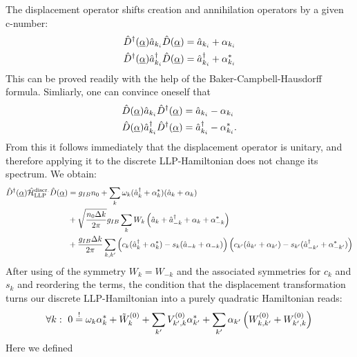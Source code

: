 The displacement operator shifts creation and annihilation operators by a given c-number:
\begin{subequations}
\begin{align}
\hat D^\dagger(\underline \alpha)\hat a_{k_i}\hat D(\underline\alpha)&=\hat a_{k_i}+\alpha_{k_i}\\
\hat D^\dagger(\underline \alpha)\hat a^\dagger_{k_i}\hat D(\underline\alpha)&=\hat a^\dagger_{k_i}+\alpha_{k_i}^*
\end{align}
\end{subequations}
This can be proved readily with the help of the Baker-Campbell-Hausdorff formula.
Simliarly, one can convince oneself that
\begin{subequations}
\begin{align}
\hat D(\underline \alpha)\hat a_{k_i}\hat D^\dagger(\underline\alpha)&=\hat a_{k_i}-\alpha_{k_i}\\
\hat D(\underline \alpha)\hat a^\dagger_{k_i}\hat D^\dagger(\underline\alpha)&=\hat a^\dagger_{k_i}-\alpha_{k_i}^*.
\end{align}
\end{subequations}
From this it follows immediately that the displacement operator is unitary, and therefore applying it to the discrete LLP-Hamiltonian does not change its spectrum.
We obtain:
\begin{align}
\hat D^\dagger(\underline \alpha)\hat{\mathcal{H}}_{\mathrm{LLP}}^{\mathrm{discr.}}\hat D(\underline\alpha) &=g_{IB}n_0+\sum\limits_k \omega_{ k}(\hat a^\dagger_{ k}+\alpha_k^*)(\hat a_{ k}+\alpha_k)\nonumber\\
&+\sqrt{\frac{n_0\Delta k}{2\pi}}g_{IB}\sum\limits_k W_k \left(\hat a_{ k}+\hat a^\dagger_{- k}+\alpha_k+\alpha_{-k}^*\right) \nonumber\\ 
&+ \frac{g_{IB}\Delta k}{2\pi}\sum\limits_{k,k^\prime} \left(c_k(\hat a^\dagger_k+\alpha_k^*)-s_k(\hat a_{-k}+\alpha_{-k})\right)\left(c_{k^\prime}(\hat a_{k^\prime}+\alpha_{k^\prime})-s_{k^\prime}(\hat a^\dagger_{-k^\prime}+\alpha_{-k^\prime}^*)\right)
\end{align}
After using of the symmetry $W_k=W_{-k}$ and the associated symmetries for $c_k$ and $s_k$ and reordering the terms, the condition that the displacement transformation turns our discrete LLP-Hamiltonian into a purely quadratic Hamiltonian reads:
\begin{equation}\label{quadratic_condition_displacement}
\forall k:\ 0\overset{!}{=}\omega_k\alpha_k^*+\tilde W_k^{(0)}+\sum\limits_{k^\prime}V_{k^\prime,k}^{(0)}\alpha_{k^\prime}^*+\sum\limits_{k^\prime}\alpha_{k^\prime}\left(W_{k,k^\prime}^{(0)}+W_{k^\prime,k}^{(0)}\right)
\end{equation}
Here we defined

